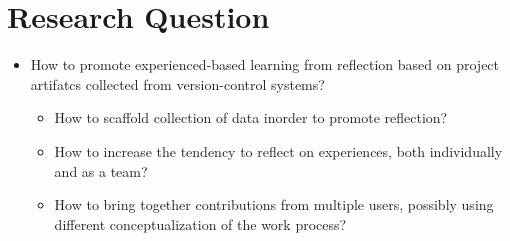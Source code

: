 \section{Research Question}

\begin{itemize}
	\item How to promote experienced-based learning from reflection based on project artifatcs collected from version-control systems?
	\begin{itemize}
		\item How to scaffold collection of data inorder to promote reflection?
		\item How to increase the tendency to reflect on experiences, both individually and as a team? 
		\item How to bring together contributions from multiple users, possibly using different conceptualization of the work process? 
	\end{itemize}
\end{itemize}